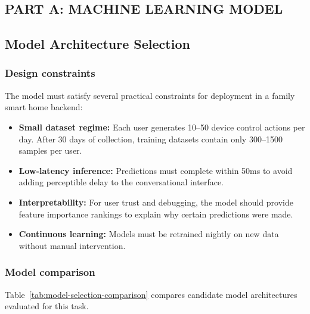 \subsection*{\Large PART A: MACHINE LEARNING MODEL}

\subsection{Model Architecture Selection}
\label{sec:model-selection}

\subsubsection{Design constraints}

The model must satisfy several practical constraints for deployment in a family smart home backend:

\begin{itemize}
    \item \textbf{Small dataset regime:} Each user generates 10--50 device control actions per day. After 30 days of collection, training datasets contain only 300--1500 samples per user.
    
    \item \textbf{Low-latency inference:} Predictions must complete within 50ms to avoid adding perceptible delay to the conversational interface.
    
    \item \textbf{Interpretability:} For user trust and debugging, the model should provide feature importance rankings to explain why certain predictions were made.
    
    \item \textbf{Continuous learning:} Models must be retrained nightly on new data without manual intervention.
\end{itemize}

\subsubsection{Model comparison}

Table~\ref{tab:model-selection-comparison} compares candidate model architectures evaluated for this task.

